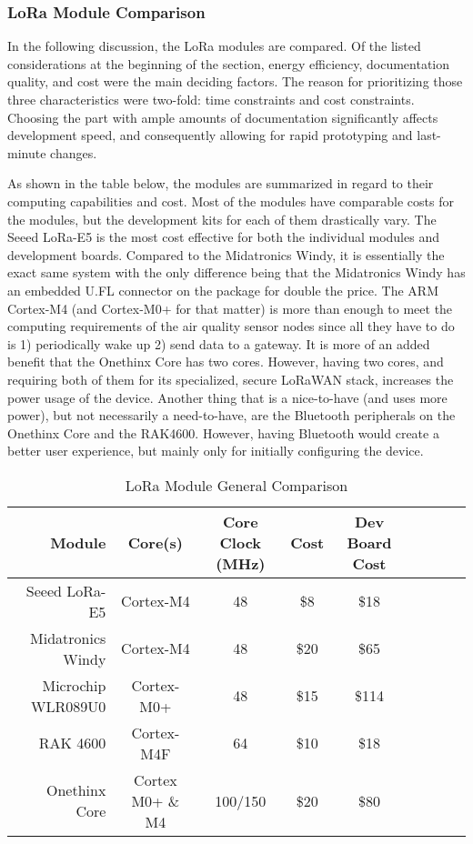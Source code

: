 \subsubsection{LoRa Module Comparison}
In the following discussion, the LoRa modules are compared. Of the listed
considerations at the beginning of the section, energy efficiency, documentation
quality, and cost were the main deciding factors. The reason for prioritizing
those three characteristics were two-fold: time constraints and cost
constraints. Choosing the part with ample amounts of documentation significantly
affects development speed, and consequently allowing for rapid prototyping and
last-minute changes.

As shown in the table below, the modules are summarized in regard to their
computing capabilities and cost. Most of the modules have comparable costs for
the modules, but the development kits for each of them drastically vary. The
Seeed LoRa-E5 is the most cost effective for both the individual modules and
development boards. Compared to the Midatronics Windy, it is essentially the
exact same system with the only difference being that the Midatronics Windy has
an embedded U.FL connector on the package for double the price. The ARM
Cortex-M4 (and Cortex-M0+ for that matter) is more than enough to meet the
computing requirements of the air quality sensor nodes since all they have to do
is 1) periodically wake up 2) send data to a gateway.  It is more of an added
benefit that the Onethinx Core has two cores. However, having two cores, and
requiring both of them for its specialized, secure LoRaWAN stack, increases the
power usage of the device. Another thing that is a nice-to-have (and uses more
power), but not necessarily a need-to-have, are the Bluetooth peripherals on the
Onethinx Core and the RAK4600. However, having Bluetooth would create a better
user experience, but mainly only for initially configuring the device.

\begin{table}[H]
\centering\scriptsize
\caption{LoRa Module General Comparison}
\begin{tabular}{|r|c|c|c|c|c|c|c|c|}
\hline
Module & Core(s) & Core Clock (MHz) & Cost & Dev Board Cost \\ 
\hline\hline

Seeed LoRa-E5       & Cortex-M4   & 48 & \$8  & \$18  \\\hline
Midatronics Windy   & Cortex-M4   & 48 & \$20 & \$65  \\\hline
Microchip WLR089U0  & Cortex-M0+  & 48 & \$15 & \$114 \\\hline
RAK 4600            & Cortex-M4F  & 64 & \$10 & \$18  \\\hline
Onethinx Core\footnotemark
                    & Cortex M0+ \& M4 & 100/150 & \$20 & \$80 \\\hline

\end{tabular}
\end{table}


